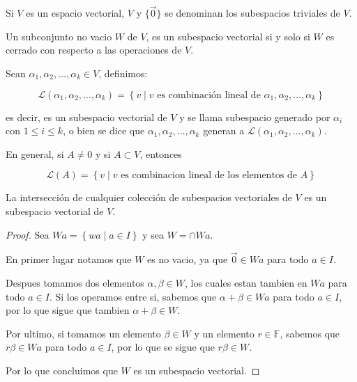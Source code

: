 		\begin{observacion}
			Si $V$ es un espacio vectorial, $V$ y $\{\vec{0}\}$ se denominan los subespacios triviales de $V$.
		\end{observacion}

		\begin{proposicion}
			Un subconjunto no vacio $W$ de $V$, es un subespacio vectorial si y solo si $W$ es cerrado con respecto a las operaciones de $V$.
		\end{proposicion}

		\begin{definicion}
			Sean $\alpha_1, \alpha_2, \dots, \alpha_k \in V$, definimos:

			\begin{equation}
				\mathcal{L}(\alpha_1, \alpha_2, \dots, \alpha_k) = \left\{ v \mid v \text{ es combinación lineal de } \alpha_1, \alpha_2, \dots, \alpha_k \right\}
			\end{equation}

			es decir, es un subespacio vectorial de $V$ y se llama subespacio generado por $\alpha_i$ con $1 \leq i \leq k$, o bien se dice que $\alpha_1, \alpha_2, \dots, \alpha_k$ generan a $\mathcal{L}(\alpha_1, \alpha_2, \dots, \alpha_k)$.

			En general, si $A \ne 0$ y si $A \subset V$, entonces

			\begin{equation}
				\mathcal{L}(A) = \left\{ v \mid v \text{ es combinacion lineal de los elementos de } A \right\}
			\end{equation}
		\end{definicion}

		\begin{proposicion}
			La intersección de cualquier colección de subespacios vectoriales de $V$ es un subespacio vectorial de $V$.
		\end{proposicion}

		\begin{proof}
			Sea $W a = \left\{ w a \mid a \in I \right\}$ y sea $W = \cap W a$.

			En primer lugar notamos que $W$ es no vacio, ya que $\vec{0} \in W a$ para todo $a \in I$.

			Despues tomamos dos elementos $\alpha, \beta \in W$, los cuales estan tambien en $W a$ para todo $a \in I$.
			Si los operamos entre si, sabemos que $\alpha + \beta \in W a$ para todo $a \in I$, por lo que sigue que tambien $\alpha + \beta \in W$.

			Por ultimo, si tomamos un elemento $\beta \in W$ y un elemento $r \in \mathbb{F}$, sabemos que $r \beta \in W a$ para todo $a \in I$, por lo que se sigue que $r \beta \in W$.

			Por lo que concluimos que $W$ es un subespacio vectorial.
		\end{proof}

